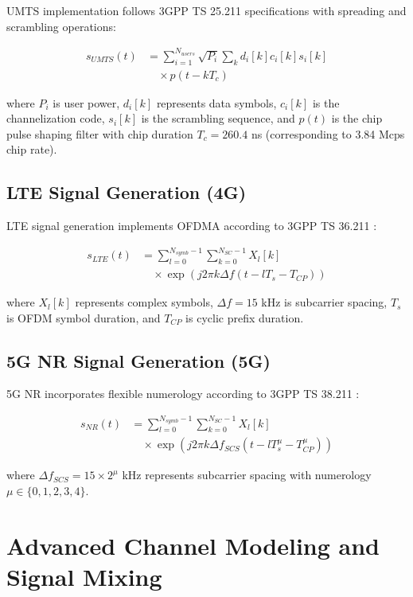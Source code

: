 \documentclass[twocolumn]{article}
\begin{document}
UMTS implementation follows 3GPP TS 25.211 specifications \cite{3gpp2018ts25211} with spreading and scrambling operations:

\begin{align}
s_{UMTS}(t) &= \sum_{i=1}^{N_{users}} \sqrt{P_i} \sum_{k} d_i[k] c_i[k] s_i[k] \nonumber \\
&\quad \times p(t-kT_c)
\end{align}

where $P_i$ is user power, $d_i[k]$ represents data symbols, $c_i[k]$ is the channelization code, $s_i[k]$ is the scrambling sequence, and $p(t)$ is the chip pulse shaping filter with chip duration $T_c = 260.4$ ns (corresponding to 3.84 Mcps chip rate).

\subsection{LTE Signal Generation (4G)}

LTE signal generation implements OFDMA according to 3GPP TS 36.211 \cite{3gpp2018ts36211}:

\begin{align}
s_{LTE}(t) &= \sum_{l=0}^{N_{symb}-1} \sum_{k=0}^{N_{SC}-1} X_l[k] \nonumber \\
&\quad \times \exp(j2\pi k \Delta f (t-lT_s-T_{CP}))
\end{align}

where $X_l[k]$ represents complex symbols, $\Delta f = 15$ kHz is subcarrier spacing, $T_s$ is OFDM symbol duration, and $T_{CP}$ is cyclic prefix duration.

\subsection{5G NR Signal Generation (5G)}

5G NR incorporates flexible numerology according to 3GPP TS 38.211 \cite{3gpp2020ts38211}:

\begin{align}
s_{NR}(t) &= \sum_{l=0}^{N_{symb}-1} \sum_{k=0}^{N_{SC}-1} X_l[k] \nonumber \\
&\quad \times \exp(j2\pi k \Delta f_{SCS} (t-lT_s^{\mu}-T_{CP}^{\mu}))
\end{align}

where $\Delta f_{SCS} = 15 \times 2^\mu$ kHz represents subcarrier spacing with numerology $\mu \in \{0,1,2,3,4\}$.

\section{Advanced Channel Modeling and Signal Mixing}
\end{document}
